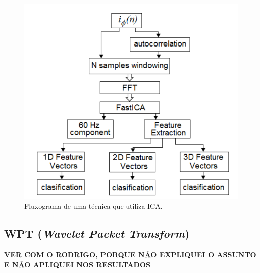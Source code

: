 \begin{figure}[H]
    \caption{Fluxograma de uma técnica que utiliza ICA.}
    \begin{center}
        \includegraphics[scale=.5]{referencial/img/ica_bracamonte_p4.png}
    \end{center}
    \label{fig:}
\end{figure}


% 

\subsection{WPT (\textit{Wavelet Packet Transform})}

\textbf{VER COM O RODRIGO, PORQUE NÃO EXPLIQUEI O ASSUNTO E NÃO APLIQUEI NOS RESULTADOS}